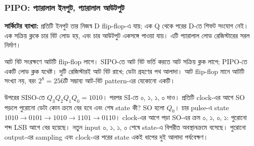 \subsubsection*{PIPO: প্যারালাল ইনপুট, প্যারালাল আউটপুট}
\begin{center}
\begin{minipage}{\linewidth}\centering\begin{chThreeDiagram}\end{chThreeDiagram}

\end{minipage}
\end{center}
\noindent\textbf{সার্কিটের ব্যাখ্যা:} প্রতিটি ইনপুট তার নিজস্ব D flip-flop-এ যায়; এক Q থেকে পরের D-তে শিফট সংযোগ নেই। এক সক্রিয় ক্লকে চার বিট লোড হয়, এবং চার আউটপুট একসঙ্গে পাওয়া যায়। এটি প্যারালাল লোড রেজিস্টারের সরল নির্মাণ।

আট বিট সংরক্ষণে আটটি flip-flop লাগে। SIPO-তে আট বিট ভর্তি করতে আট সক্রিয় ক্লক লাগে; PIPO-তে একটি লোড ক্লক যথেষ্ট।
\chThreeAnswer দুটি রেজিস্টারই আট বিট রাখে; ডেটা গ্রহণের পথ আলাদা। আট flip-flop মানে আটটি সংখ্যা নয়, বরং $2^8=256$টি সম্ভাব্য আট-বিট pattern-এর যেকোনো একটি।

উপরের SISO-তে $Q_3Q_2Q_1Q_0=1010$। পরপর SI-তে ০, ১, ১, ০ দাও। প্রতিটি clock-এর আগে SO পড়লে পুরোনো ডেটা কোন ক্রমে বের হবে এবং শেষ state কী?
\chThreeAnswer SO হলো $Q_0$। চার pulse-এ state $1010\to0101\to1010\to1101\to0110$। clock-এর আগে পড়া SO-এর ক্রম ০, ১, ০, ১: পুরোনো শব্দ LSB আগে বের হয়েছে। নতুন input ০, ১, ১, ০ শেষে state-এ বিপরীত অবস্থানক্রমে বসেছে। পুরোনো output-এর sampling এবং clock-এর পরের state একই ধাপের দুই আলাদা পর্যবেক্ষণ।
